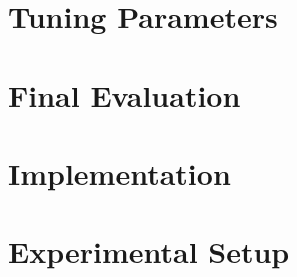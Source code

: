 \documentclass[a4paper,12pt,titlepage, BCOR7mm,headsepline]{scrbook}
\numberwithin{equation}{section}
\begin{document}



\section{Tuning Parameters}
\section{Final Evaluation}
\section{Implementation}
\section{Experimental Setup}
\end{document}
